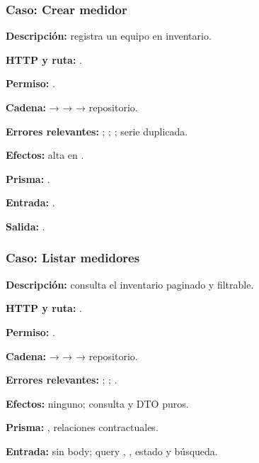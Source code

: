 \subsubsection{Caso: Crear medidor}


\textbf{Descripción:} registra un equipo en inventario.  

\textbf{HTTP y ruta:} \texttt{}.  

\textbf{Permiso:} \texttt{}.  

\textbf{Cadena:} \texttt{} → \texttt{} → \texttt{} → repositorio.  

\textbf{Errores relevantes:} \texttt{}; \texttt{}; \texttt{}; \texttt{} serie duplicada.  

\textbf{Efectos:} alta en \texttt{}.  

\textbf{Prisma:} \texttt{}.  

\textbf{Entrada:} \texttt{}.  

\textbf{Salida:} \texttt{}.


\subsubsection{Caso: Listar medidores}


\textbf{Descripción:} consulta el inventario paginado y filtrable.  

\textbf{HTTP y ruta:} \texttt{}.  

\textbf{Permiso:} \texttt{}.  

\textbf{Cadena:} \texttt{} → \texttt{} → \texttt{} → repositorio.  

\textbf{Errores relevantes:} \texttt{}; \texttt{}; \texttt{}.  

\textbf{Efectos:} ninguno; consulta y DTO puros.  

\textbf{Prisma:} \texttt{}, relaciones contractuales.  

\textbf{Entrada:} sin body; query \texttt{}, \texttt{}, estado y búsqueda.  

